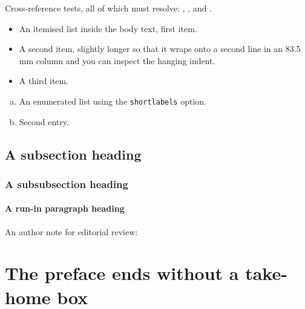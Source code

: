 Cross-reference tests, all of which must resolve:
, ,  and
.

\begin{itemize}
\item An itemised list inside the body text, first item.
\item A second item, slightly longer so that it wraps onto a second line in
      an 83.5\,mm column and you can inspect the hanging indent.
\item A third item.
\end{itemize}

\begin{enumerate}[(a)]
\item An enumerated list using the \texttt{shortlabels} option.
\item Second entry.
\end{enumerate}

\lipsum[18]

\subsection{A subsection heading}

\lipsum[19]

\subsubsection{A subsubsection heading}

\lipsum[20]

\paragraph{A run-in paragraph heading} \lipsum[21]

An author note for editorial review: 

\lipsum[22]

\section{The preface ends without a take-home box}

\lipsum[23-24]